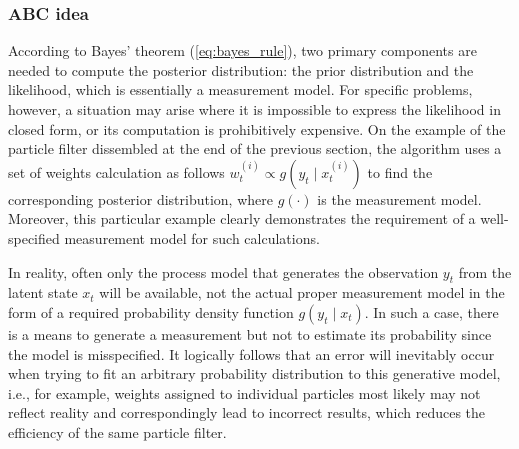 \subsubsection{ABC idea}
According to Bayes' theorem (\ref{eq:bayes_rule}), two primary components are needed to compute the posterior distribution: the prior distribution and the likelihood, which is essentially a measurement model. For specific problems, however, a situation may arise where it is impossible to express the likelihood in closed form, or its computation is prohibitively expensive.
On the example of the particle filter dissembled at the end of the previous section, the algorithm uses a set of weights calculation as follows \(w_t^{(i)} \propto g\left(y_t \mid x_t^{(i)}\right)\) to find the corresponding posterior distribution, where \(g\left( \cdot \right)\) is the measurement model. Moreover, this particular example clearly demonstrates the requirement of a well-specified measurement model for such calculations.

In reality, often only the process model that generates the observation \(y_t\) from the latent state \(x_t\) will be available, not the actual proper measurement model in the form of a required probability density function \(g\left(y_t \mid x_t\right)\). In such a case, there is a means to generate a measurement but not to estimate its probability since the model is misspecified. It logically follows that an error will inevitably occur when trying to fit an arbitrary probability distribution to this generative model, i.e., for example, weights assigned to individual particles most likely may not reflect reality and correspondingly lead to incorrect results, which reduces the efficiency of the same particle filter.

